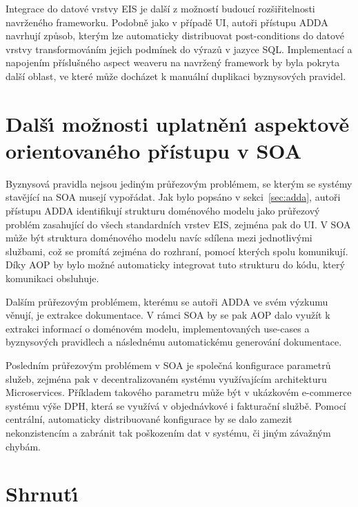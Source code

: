 Integrace do datové vrstvy \gls{EIS} je další z možností budoucí rozšiřitelnosti navrženého frameworku.
Podobně jako v případě \gls{UI}, autoři přístupu \gls{ADDA} navrhují způsob, kterým lze automaticky distribuovat
post-conditions do datové vrstvy transformováním jejich podmínek do výrazů v jazyce \gls{SQL}.
Implementací a napojením příslušného aspect weaveru na navržený framework by byla pokryta další oblast,
ve které může docházet k manuální duplikaci byznysových pravidel.

\section{Dalš\'{\i} možnosti uplatněn\'{\i} aspektově orientovaného přístupu v SOA}

Byznysová pravidla nejsou jediným průřezovým problémem, se kterým se systémy stavějící na \gls{SOA} musejí
vypořádat. Jak bylo popsáno v sekci~\ref{sec:adda}, autoři přístupu \gls{ADDA} identifikují strukturu
doménového modelu jako průřezový problém zasahující do všech standardních vrstev \gls{EIS},
zejména pak do \gls{UI}. V \gls{SOA} může být struktura doménového modelu navíc sdílena mezi jednotlivými
službami, což se promítá zejména do rozhraní, pomocí kterých spolu komunikují.
Díky \gls{AOP} by bylo možné automaticky integrovat tuto strukturu do kódu, který komunikaci obsluhuje.

Dalším průřezovým problémem, kterému se autoři \gls{ADDA} ve svém výzkumu věnují, je extrakce dokumentace.
V rámci \gls{SOA} by se pak \gls{AOP} dalo využít k extrakci informací o doménovém modelu, implementovaných use-cases
a byznysových pravidlech a následnému automatickému generování dokumentace.

Posledním průřezovým problémem v \gls{SOA} je společná konfigurace parametrů služeb, zejména pak v
decentralizovaném systému využívajícím architekturu Microservices. Příkladem takového parametru může
být v ukázkovém e-commerce systému výše DPH, která se využívá v objednávkové i
fakturační službě. Pomocí centrální, automaticky distribuované konfigurace by se dalo zamezit nekonzistencím
a zabránit tak poškozením dat v systému, či jiným závažným chybám.

\section{Shrnut\'{\i}}

